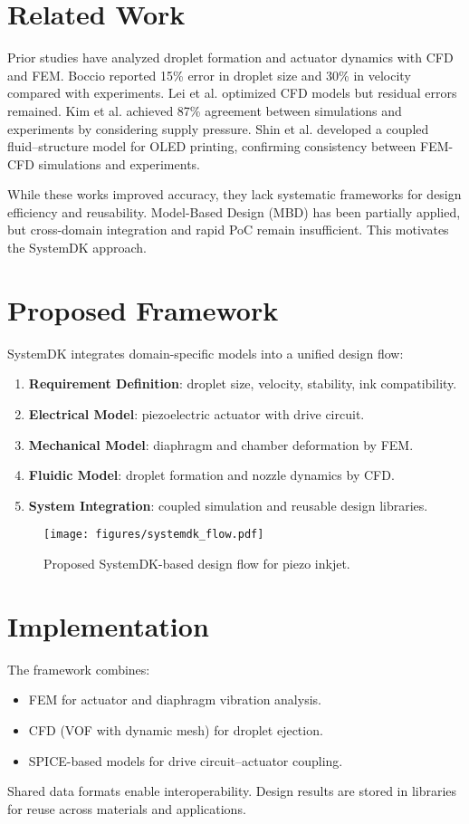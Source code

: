 \documentclass[conference]{IEEEtran}
\begin{document}
\section{Related Work}
Prior studies have analyzed droplet formation and actuator dynamics with CFD and FEM. 
Boccio \cite{boccio2003} reported 15\% error in droplet size and 30\% in velocity compared with experiments. 
Lei et al. \cite{lei2012} optimized CFD models but residual errors remained. 
Kim et al. \cite{kim2022} achieved 87\% agreement between simulations and experiments by considering supply pressure. 
Shin et al. \cite{shin2025} developed a coupled fluid–structure model for OLED printing, confirming consistency between FEM-CFD simulations and experiments. 

While these works improved accuracy, they lack systematic frameworks for design efficiency and reusability. 
Model-Based Design (MBD) has been partially applied, but cross-domain integration and rapid PoC remain insufficient. 
This motivates the SystemDK approach.

\section{Proposed Framework}
SystemDK integrates domain-specific models into a unified design flow:
\begin{enumerate}
  \item \textbf{Requirement Definition}: droplet size, velocity, stability, ink compatibility.
  \item \textbf{Electrical Model}: piezoelectric actuator with drive circuit.
  \item \textbf{Mechanical Model}: diaphragm and chamber deformation by FEM.
  \item \textbf{Fluidic Model}: droplet formation and nozzle dynamics by CFD.
  \item \textbf{System Integration}: coupled simulation and reusable design libraries.
\end{enumerate}

\begin{figure}[ht]
\centering
\texttt{[image: figures/systemdk\_flow.pdf]}
\caption{Proposed SystemDK-based design flow for piezo inkjet.}
\label{fig:flow}
\end{figure}

\section{Implementation}
The framework combines:
\begin{itemize}
  \item FEM for actuator and diaphragm vibration analysis.
  \item CFD (VOF with dynamic mesh) for droplet ejection.
  \item SPICE-based models for drive circuit–actuator coupling.
\end{itemize}
Shared data formats enable interoperability. 
Design results are stored in libraries for reuse across materials and applications.
\end{document}
